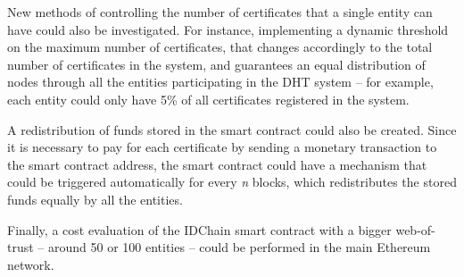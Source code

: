 New methods of controlling the number of certificates that a single entity can have could also be investigated.
For instance, implementing a dynamic threshold on the maximum number of certificates, that changes accordingly to the total number of certificates in the system, and guarantees an equal distribution of nodes through all the entities participating in the DHT system – for example, each entity could only have 5\% of all certificates registered in the system.

A redistribution of funds stored in the smart contract could also be created.
Since it is necessary to pay for each certificate by sending a monetary transaction to the smart contract address, the smart contract could have a mechanism that could be triggered automatically for every \textit{n} blocks, which redistributes the stored funds equally by all the entities.

Finally, a cost evaluation of the IDChain smart contract with a bigger web-of-trust – around 50 or 100 entities – could be performed in the main Ethereum network.

\cleardoublepage
